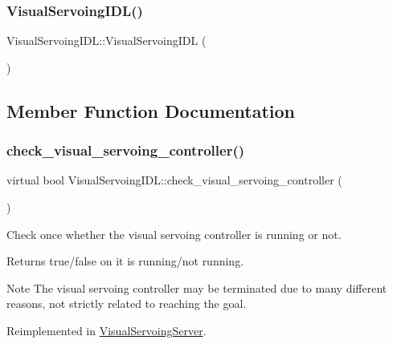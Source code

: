 \subsubsection{\texorpdfstring{Visual\+Servoing\+I\+D\+L()}{VisualServoingIDL()}}
{\footnotesize\ttfamily Visual\+Servoing\+I\+D\+L\+::\+Visual\+Servoing\+I\+DL (\begin{DoxyParamCaption}{ }\end{DoxyParamCaption})}



\subsection{Member Function Documentation}
\mbox{\label{classVisualServoingIDL_a6426bda1341487c0dbb1f6a048a45deb}} 
\subsubsection{\texorpdfstring{check\+\_\+visual\+\_\+servoing\+\_\+controller()}{check\_visual\_servoing\_controller()}}
{\footnotesize\ttfamily virtual bool Visual\+Servoing\+I\+D\+L\+::check\+\_\+visual\+\_\+servoing\+\_\+controller (\begin{DoxyParamCaption}{ }\end{DoxyParamCaption})\hspace{0.3cm}{\ttfamily [virtual]}}



Check once whether the visual servoing controller is running or not. 

\begin{DoxyReturn}{Returns}
true/false on it is running/not running. 
\end{DoxyReturn}
\begin{DoxyNote}{Note}
The visual servoing controller may be terminated due to many different reasons, not strictly related to reaching the goal. 
\end{DoxyNote}


Reimplemented in \hyperlink{classVisualServoingServer_a17a9b2913815c52b5a1bd2fd84d9f18e}{Visual\+Servoing\+Server}.

